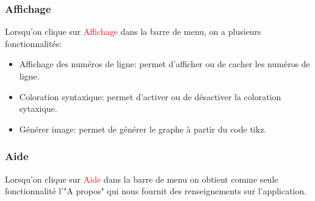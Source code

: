 \documentclass[a4paper]{report}
\begin{document}
 \subsubsection{Affichage}
Lorsqu'on clique sur \textcolor{red}{Affichage} dans la barre de menu, on a plusieurs fonctionnalités:
\begin{itemize}
 \item Affichage des numéros de ligne: permet d'afficher ou de cacher les numéros de ligne. 
 \item Coloration syntaxique: permet d'activer ou de désactiver la coloration sytaxique.
 \item Générer image: permet de générer le graphe à partir du code tikz.
\end{itemize}
 \subsubsection{Aide}
Lorsqu'on clique sur \textcolor{red}{Aide} dans la barre de menu on obtient comme seule fonctionnalité l'"A propos" qui nous fournit des renseignements sur l'application.
\end{document}

